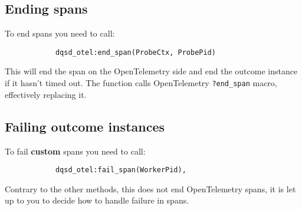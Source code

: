     \subsection{Ending spans}
        To end spans you need to call:
        \begin{verbatim}
            dqsd_otel:end_span(ProbeCtx, ProbePid)
        \end{verbatim}
        This will end the span on the OpenTelemetry side and end the outcome instance if it hasn't timed out.
        The function calls OpenTelemetry \texttt{?end\_span} macro, effectively replacing it.

    \subsection{Failing outcome instances}
        To fail \textbf{custom} spans you need to call:
        \begin{verbatim}
            dqsd_otel:fail_span(WorkerPid),
        \end{verbatim}
        Contrary to the other methods, this does not end OpenTelemetry spans, it is let up to you to decide how to handle failure in spans.


